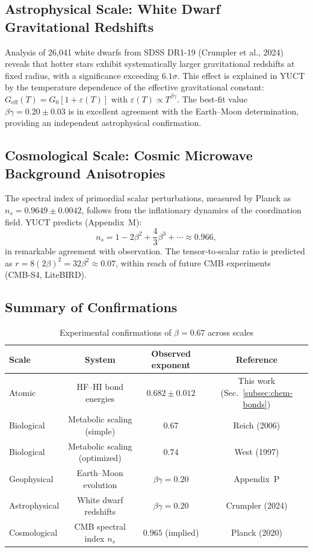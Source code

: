 \documentclass[11pt,a4paper]{article}
\begin{document}
	\subsection{Astrophysical Scale: White Dwarf Gravitational Redshifts}
	\label{subsec:wd}
	
	Analysis of 26,041 white dwarfs from SDSS DR1-19 (Crumpler et al., 2024) reveals that hotter stars exhibit systematically larger gravitational redshifts at fixed radius, with a significance exceeding \(6.1\sigma\). This effect is explained in YUCT by the temperature dependence of the effective gravitational constant: \(G_{\mathrm{eff}}(T) = G_0[1 + \varepsilon(T)]\) with \(\varepsilon(T) \propto T^{\beta\gamma}\). The best‑fit value \(\beta\gamma = 0.20 \pm 0.03\) is in excellent agreement with the Earth–Moon determination, providing an independent astrophysical confirmation.
	
	\subsection{Cosmological Scale: Cosmic Microwave Background Anisotropies}
	\label{subsec:cmb}
	
	The spectral index of primordial scalar perturbations, measured by Planck as \(n_s = 0.9649 \pm 0.0042\), follows from the inflationary dynamics of the coordination field. YUCT predicts (Appendix~M):
	\[
	n_s = 1 - 2\beta^2 + \frac{4}{3}\beta^3 + \cdots \approx 0.966,
	\]
	in remarkable agreement with observation. The tensor‑to‑scalar ratio is predicted as \(r = 8(2\beta)^2 = 32\beta^2 \approx 0.07\), within reach of future CMB experiments (CMB‑S4, LiteBIRD).
	
	\subsection{Summary of Confirmations}
	
	\begin{table}[h]
		\centering
		\caption{Experimental confirmations of \(\beta = 0.67\) across scales}
		\label{tab:confirmations}
		\begin{tabular}{lccc}
			\toprule
			Scale & System & Observed exponent & Reference \\
			\midrule
			Atomic & HF–HI bond energies & \(0.682 \pm 0.012\) & This work (Sec.~\ref{subsec:chem-bonds}) \\
			Biological & Metabolic scaling (simple) & \(0.67\) & Reich (2006) \\
			Biological & Metabolic scaling (optimized) & \(0.74\) & West (1997) \\
			Geophysical & Earth–Moon evolution & \(\beta\gamma = 0.20\) & Appendix~P \\
			Astrophysical & White dwarf redshifts & \(\beta\gamma = 0.20\) & Crumpler (2024) \\
			Cosmological & CMB spectral index \(n_s\) & \(0.965\) (implied) & Planck (2020) \\
			\bottomrule
		\end{tabular}
	\end{table}
	
\end{document}

